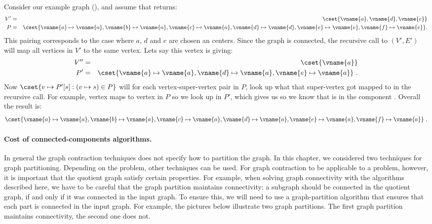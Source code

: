 {\begin{example}
  Consider our example graph (), and assume that
   returns:
\begin{eqnarray*}
V' & = & \cset{\vname{a},\vname{d},\vname{e}}\\
P & = & 
 \cset{\vname{a} \mapsto \vname{a}, \vname{b} \mapsto \vname{a}, 
       \vname{c} \mapsto \vname{a}, \vname{d} \mapsto \vname{d}, 
       \vname{e} \mapsto \vname{e}, \vname{f} \mapsto \vname{e}}.
\end{eqnarray*}
%
This pairing corresponds to the case where $a$, $d$ and $e$ are chosen
an centers.
%
Since the graph is connected, the recursive call to
$(V',E')$ will map all vertices in $V'$ to
the same vertex.  Lets say this vertex is  giving:
\begin{eqnarray*}
V'' & = & \cset{\vname{a}}\\
P' & = & \cset{\vname{a} \mapsto \vname{a}, \vname{d} \mapsto \vname{a}, \vname{e} \mapsto \vname{a}}~.
\end{eqnarray*}
%
Now $\cset{v \mapsto P'[s] : (v \mapsto s) \in P}$ will for each
vertex-super-vertex pair in $P$, look up what that super-vertex got
mapped to in the recursive call.  For example, vertex  maps
to vertex  in $P$ so we look up  in $P'$, which
gives us  so we know that  is in the component
.  Overall the result is:
%
\[\cset{\vname{a} \mapsto \vname{a}, 
                          \vname{b} \mapsto \vname{a}, 
                          \vname{c} \mapsto \vname{a}, 
                          \vname{d} \mapsto \vname{a}, 
                          \vname{e} \mapsto \vname{a}, 
                          \vname{f} \mapsto \vname{a}}\;.\]
\end{example}


\paragraph{Cost of connected-components algorithms.}


\begin{remark}
  In general the graph contraction techniques does not specify how to
  partition the graph.  In this chapter, we
  considered two techniques for graph partitioning.  Depending on the problem,
  other techniques can be used.  For graph contraction to be
  applicable to a problem, however, it is important that the quotient graph satisfy certain properties.  For example,
  when solving graph connectivity with the algorithms described here,
  we have to be careful that the graph partition maintains connectivity:
  a subgraph should be connected in the quotient graph, if and only if
  it was connected in the input graph.  To ensure this,
  we will need to use a graph-partition algorithm that ensures that each
  part is connected in the input graph.  For example, the pictures
  below illustrate two graph partitions. The first graph partition
  maintains connectivity,  the second one does not.


\end{remark}}
